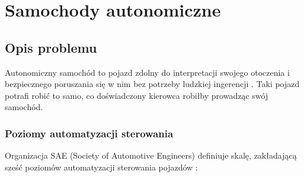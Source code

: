 \chapter{Samochody autonomiczne}

\section{Opis problemu}
Autonomiczny samochód to pojazd zdolny do interpretacji swojego otoczenia i bezpiecznego poruszania się w nim bez potrzeby ludzkiej ingerencji \cite{synopsys:whatIsAutonomousCar}. Taki pojazd potrafi robić to samo, co doświadczony kierowca robiłby prowadząc swój samochód.

\subsection{Poziomy automatyzacji sterowania}
Organizacja SAE (Society of Automotive Engineers) definiuje skalę, zakładającą sześć poziomów automatyzacji sterowania pojazdów \cite{synopsys:sixLevelsOfCarAutonomy}:

